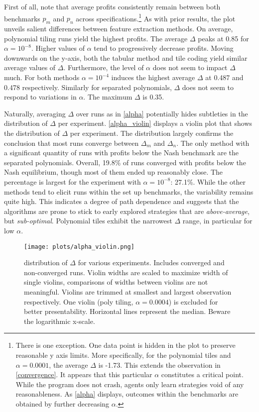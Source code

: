 First of all, note that average profits consistently remain between both benchmarks $p_m$ and $p_n$ across specifications.\footnote{There is one exception. One data point is hidden in the plot to preserve reasonable y axis limits. More specifically, for the polynomial tiles and $\alpha = 0.0001$, the average $\Delta$ is -1.73. This extends the observation in \autoref{convergence}. It appears that this particular $\alpha$ constitutes a critical point. While the program does not crash, agents only learn strategies void of any reasonableness. As \autoref{alpha} displays, outcomes within the benchmarks are obtained by further decreasing $\alpha$.} As with prior results, the plot unveils salient differences between feature extraction methods.  On average, polynomial tiling runs yield the highest profits. The average $\Delta$ peaks at 0.85 for $\alpha = 10^{-8}$. Higher values of $\alpha$ tend to progressively decrease profits. Moving downwards on the y-axis, both the tabular method and tile coding yield similar average values of $\Delta$. Furthermore, the level of $\alpha$ does not seem to impact $\Delta$ much. For both methods $\alpha = 10^{-4}$ induces the highest average $\Delta$ at 0.487 and 0.478 respectively. Similarly for separated polynomials, $\Delta$ does not seem to respond to variations in $\alpha$. The maximum $\Delta$ is 0.35.

Naturally, averaging $\Delta$ over runs as in \autoref{alpha} potentially hides subtleties in the distribution of $\Delta$ per experiment. \autoref{alpha_violin} displays a violin plot that shows the distribution of $\Delta$ per experiment. The distribution largely confirms the conclusion that most runs converge between $\Delta_m$ and $\Delta_n$. The only method with a significant quantity of runs with profits below the Nash benchmark are the separated polynomials. Overall, 19.8\% of runs converged with profits below the Nash equilibrium, though most of them ended up reasonably close. The percentage is largest for the experiment with $\alpha = 10^{-8}$: 27.1\%. While the other methods tend to elicit runs within the set up benchmarks, the variability remains quite high. This indicates a degree of path dependence and suggests that the algorithms are prone to stick to early explored strategies that are \emph{above-average}, but \emph{sub-optimal}. Polynomial tiles exhibit the narrowest $\Delta$ range, in particular for low $\alpha$.

\begin{figure}
	\texttt{[image: plots/alpha\_violin.png]}
	\caption{distribution of $\Delta$ for various experiments. Includes converged and non-converged runs. Violin widths are scaled to maximize width of single violins, comparisons of widths between violins are not meaningful. Violins are trimmed at smallest and largest observation respectively. One violin (poly tiling, $\alpha = 0.0004$) is excluded for better presentability. Horizontal lines represent the median. Beware the logarithmic x-scale.}
	\label{alpha_violin}
\end{figure}



